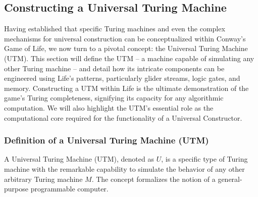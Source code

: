 \documentclass{article}
\theoremstyle{definition}
\theoremstyle{plain}
\theoremstyle{plain}
\begin{document}
\subsection{Constructing a Universal Turing Machine \cite{Goucher_2011_UTM}}

Having established that specific Turing machines and even the complex mechanisms for universal construction can be conceptualized within Conway's Game of Life, we now turn to a pivotal concept: the Universal Turing Machine (UTM). This section will define the UTM – a machine capable of simulating any other Turing machine – and detail how its intricate components can be engineered using Life's patterns, particularly glider streams, logic gates, and memory. Constructing a UTM within Life is the ultimate demonstration of the game's Turing completeness, signifying its capacity for any algorithmic computation. We will also highlight the UTM's essential role as the computational core required for the functionality of a Universal Constructor.

\subsubsection{Definition of a Universal Turing Machine (UTM)}
A Universal Turing Machine (UTM), denoted as $U$, is a specific type of Turing machine with the remarkable capability to simulate the behavior of any other arbitrary Turing machine $M$. The concept formalizes the notion of a general-purpose programmable computer.
\end{document}
